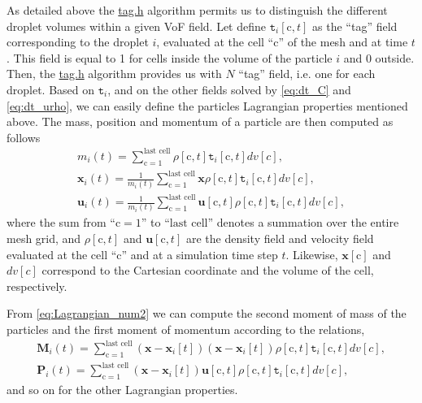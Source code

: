 As detailed above the \href{http://basilisk.fr/src/tag.h}{tag.h} algorithm permits us to distinguish the different droplet volumes within a given VoF field. 
Let define $\texttt{t}_i[\text{c},t]$ as the ``tag'' field corresponding to the droplet $i$, evaluated at the cell ``c'' of the mesh and at time $t$.
This field is equal to 1 for cells inside the volume of the particle $i$ and 0 outside.
Then, the \href{http://basilisk.fr/src/tag.h}{tag.h} algorithm provides us with $N$ ``tag'' field, i.e. one for each droplet. 
Based on $\texttt{t}_i$, and on the other fields solved by \ref{eq:dt_C} and \ref{eq:dt_urho}, we can easily define the particles Lagrangian properties mentioned above. 
The mass, position and momentum of a particle are then computed as follows 
\begin{align}
    m_i(t)
    = \sum_{\text{c} = 1}^\text{last cell}
    \rho [\text{c},t]
    \texttt{t}_i[\text{c},t]dv[c],
    \\ 
    \textbf{x}_i(t)
    = 
    \frac{1}{m_i(t)}
    \sum_{\text{c} = 1}^\text{last cell}
    \textbf{x} 
    \rho [\text{c},t]
    \texttt{t}_i[\text{c},t]dv[c],
    \\ 
    \textbf{u}_i(t)
    = 
    \frac{1}{m_i(t)}
    \sum_{\text{c} = 1}^\text{last cell}
    \textbf{u} [\text{c},t]
    \rho [\text{c},t]
    \texttt{t}_i[\text{c},t]dv[c],
    \label{eq:Lagrangian_num2}
\end{align}
where the sum from ``$\text{c} = 1$'' to ``$\text{last cell}$'' denotes a summation over the entire mesh grid, and $\rho[\text{c},t]$ and $\textbf{u}[\text{c},t]$ are the density field and velocity field evaluated at the cell ``c'' and at a simulation time step $t$. 
Likewise, $\textbf{x}[\text{c}]$ and $dv[c]$ correspond to the Cartesian coordinate and the volume of the cell, respectively. 

From \ref{eq:Lagrangian_num2} we can compute the second moment of mass of the particles and the first moment of momentum according to the relations, 
\begin{align*}
  \textbf{M}_i(t)
  = 
  \sum_{\text{c} = 1}^\text{last cell}
  (\textbf{x} - \textbf{x}_i[t])
  (\textbf{x} - \textbf{x}_i[t])
  \rho [\text{c},t]
  \texttt{t}_i[\text{c},t]dv[c],
  \\ 
  \textbf{P}_i(t)
  = 
  \sum_{\text{c} = 1}^\text{last cell}
  (\textbf{x} - \textbf{x}_i[t])
  \textbf{u} [\text{c},t]
  \rho [\text{c},t]
  \texttt{t}_i[\text{c},t]dv[c],
\end{align*}
and so on for the other Lagrangian properties. 

